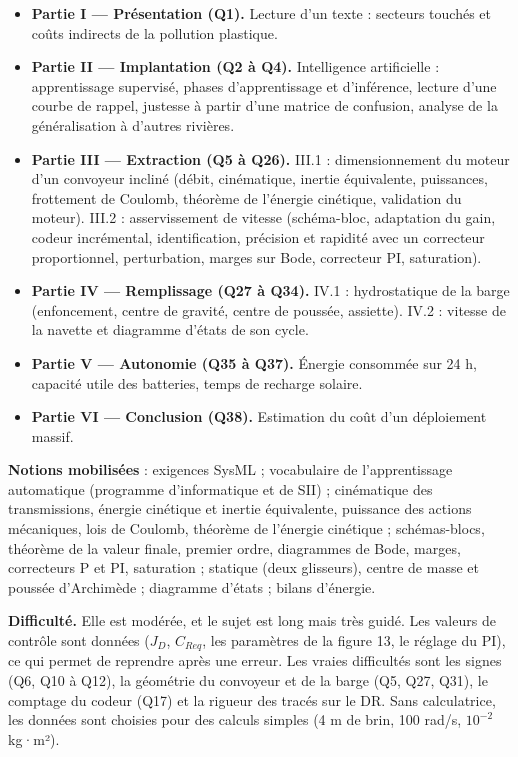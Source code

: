 \documentclass[11pt,a4paper]{article}
\providecommand{\tightlist}{\setlength{\itemsep}{0pt}\setlength{\parskip}{0pt}}
\begin{document}
\begin{itemize}
\tightlist
\item
  \textbf{Partie I --- Présentation (Q1).} Lecture d'un texte : secteurs touchés et coûts indirects de la pollution plastique.
\item
  \textbf{Partie II --- Implantation (Q2 à Q4).} Intelligence artificielle : apprentissage supervisé, phases d'apprentissage et d'inférence, lecture d'une courbe de rappel, justesse à partir d'une matrice de confusion, analyse de la généralisation à d'autres rivières.
\item
  \textbf{Partie III --- Extraction (Q5 à Q26).} III.1 : dimensionnement du moteur d'un convoyeur incliné (débit, cinématique, inertie équivalente, puissances, frottement de Coulomb, théorème de l'énergie cinétique, validation du moteur). III.2 : asservissement de vitesse (schéma-bloc, adaptation du gain, codeur incrémental, identification, précision et rapidité avec un correcteur proportionnel, perturbation, marges sur Bode, correcteur PI, saturation).
\item
  \textbf{Partie IV --- Remplissage (Q27 à Q34).} IV.1 : hydrostatique de la barge (enfoncement, centre de gravité, centre de poussée, assiette). IV.2 : vitesse de la navette et diagramme d'états de son cycle.
\item
  \textbf{Partie V --- Autonomie (Q35 à Q37).} Énergie consommée sur 24 h, capacité utile des batteries, temps de recharge solaire.
\item
  \textbf{Partie VI --- Conclusion (Q38).} Estimation du coût d'un déploiement massif.
\end{itemize}

\textbf{Notions mobilisées} : exigences SysML ; vocabulaire de l'apprentissage automatique (programme d'informatique et de SII) ; cinématique des transmissions, énergie cinétique et inertie équivalente, puissance des actions mécaniques, lois de Coulomb, théorème de l'énergie cinétique ; schémas-blocs, théorème de la valeur finale, premier ordre, diagrammes de Bode, marges, correcteurs P et PI, saturation ; statique (deux glisseurs), centre de masse et poussée d'Archimède ; diagramme d'états ; bilans d'énergie.

\textbf{Difficulté.} Elle est modérée, et le sujet est long mais très guidé. Les valeurs de contrôle sont données (\(J_D\), \(C_{Req}\), les paramètres de la figure 13, le réglage du PI), ce qui permet de reprendre après une erreur. Les vraies difficultés sont les signes (Q6, Q10 à Q12), la géométrie du convoyeur et de la barge (Q5, Q27, Q31), le comptage du codeur (Q17) et la rigueur des tracés sur le DR. Sans calculatrice, les données sont choisies pour des calculs simples (4 m de brin, 100 rad/s, \(10^{-2}\) kg·m²).
\end{document}
